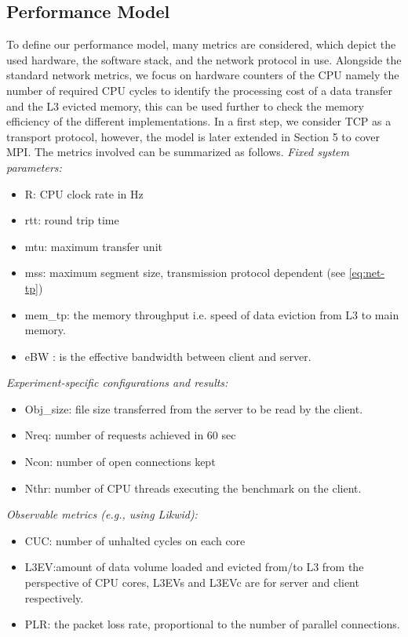 \documentclass[runningheads]{llncs}
\begin{document}
\subsection{Performance Model}
To define our performance model, many metrics are considered, which depict the used hardware, the software stack, and the network protocol in use. Alongside the standard network metrics, we focus on hardware counters of the CPU namely the number of required CPU cycles to identify the processing cost of a data transfer and the L3 evicted memory, this can be used further to check the memory efficiency of the different implementations. In a first step, we consider TCP as a transport protocol, however, the model is later extended in Section 5 to cover MPI. The metrics involved can be summarized as follows.
\textit{Fixed system parameters:}
\begin{itemize}
\item R: CPU clock rate in Hz
\item rtt: round trip time
\item mtu: maximum transfer unit
\item mss: maximum segment size, transmission protocol dependent (see \cref{eq:net-tp})
\item mem\_tp: the memory throughput i.e. speed of data eviction from L3 to main memory.
\item eBW \cite{chang1995effective}: is the effective bandwidth between client and server.
\end{itemize}
\textit{Experiment-specific configurations and results:}
\begin{itemize}
\item Obj\_size: file size transferred from the server to be read by the client.
\item Nreq: number of requests achieved in 60 sec
\item Ncon: number of open connections kept
\item Nthr: number of CPU threads executing the benchmark on the client.
\end{itemize}
\textit{Observable metrics (e.g., using Likwid):}
\begin{itemize}
\item CUC: number of unhalted cycles on each core %
\item L3EV:amount of data volume loaded and evicted from/to L3 from the perspective of CPU cores\cite{l3explainedlik,intel-l3}, L3EVs and L3EVc are for server and client respectively.
\item PLR: the packet loss rate, proportional to the number of parallel connections. 
\end{itemize}
\end{document}
